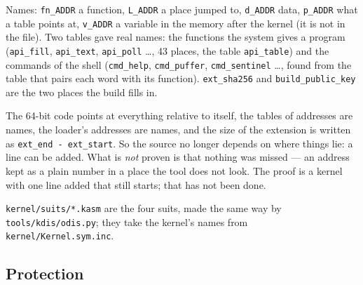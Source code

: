\documentclass[11pt,a4paper]{article}
\newcommand{\file}[1]{\texttt{#1}}
\begin{document}
\noindent Names: \texttt{fn\_ADDR} a function, \texttt{L\_ADDR} a place jumped to, \texttt{d\_ADDR}
data, \texttt{p\_ADDR} what a table points at, \texttt{v\_ADDR} a variable in the memory after the
kernel (it is not in the file). Two tables gave real names: the functions the system gives a
program (\texttt{api\_fill}, \texttt{api\_text}, \texttt{api\_poll} \ldots, 43 places, the table
\texttt{api\_table}) and the commands of the shell (\texttt{cmd\_help}, \texttt{cmd\_puffer},
\texttt{cmd\_sentinel} \ldots, found from the table that pairs each word with its function).
\texttt{ext\_sha256} and \texttt{build\_public\_key} are the two places the build fills in.

The 64-bit code points at everything relative to itself, the tables of addresses are names, the
loader's addresses are names, and the size of the extension is written as
\texttt{ext\_end - ext\_start}. So the source no longer depends on where things lie: a line can be
added. What is \emph{not} proven is that nothing was missed --- an address kept as a plain number
in a place the tool does not look. The proof is a kernel with one line added that still starts;
that has not been done.

\file{kernel/suits/*.kasm} are the four suits, made the same way by \file{tools/kdis/odis.py};
they take the kernel's names from \file{kernel/Kernel.sym.inc}.

\subsection{Protection}
\end{document}
